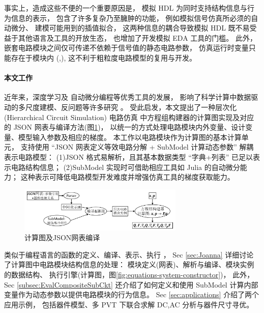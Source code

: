 事实上，造成这些不便的一个重要原因是，
模拟 HDL 为同时支持结构信息与行为信息的表示，
包含了许多复杂乃至臃肿的功能，
例如模拟信号仿真所必须的自动微分、
建模可能用到的插值拟合\cite[Sec4.5.6,Sec9.21]{verilog2014verilog}，
这两种信息的耦合导致模拟 HDL 既不易受益于其他语言及工具的开放生态，
也增加了开发模拟 EDA 工具的门槛。
此外，嵌套电路模块之间仅可传递不依赖于信号值的静态电路参数，
仿真运行时变量只能存在于模块内
(\cite[Sec3.4,Sec6]{verilog2014verilog},\cite[Sec4.10]{ieee2006ieee-1364-2005}),
这不利于粗粒度电路模型的复用与开发。

\paragraph{本文工作} 近年来，深度学习\cite{goodfellow2016deep}及
自动微分编程\cite{baydin2018automatic}等优秀工具的发展，
影响了科学计算中数据驱动的多尺度建模、反问题等许多研究
\cite{zhang2018deep,long2018pde,long2019pde}。
受此启发，本文提出了一种层次化(Hierarchical Circuit Simulation)
电路仿真\cite{fijnvandraat2002time,
ter1999numerical,mukherjee1999hierarchical,tcherniaev2003transistor}
中方程组构建器的计算图实现及对应的 JSON 网表与编译方法(图\ref{fig:flowchart})，
以统一的方式处理电路模块内外变量、设计变量、模型输入参数及相应的梯度。
本工作以电路模块作为计算图的基本计算单元，
支持使用 “JSON 网表定义等效电路分解 + SubModel 计算动态参数” 解耦表示电路模型：
(1)JSON 格式易解析，且其基本数据类型 “字典+列表” 已足以表示电路结构信息；
(2)SubModel 实现时可借助相应工具如 Julia\cite{Bezanson_Julia_A_fresh_2017}
的自动微分能力； 这种表示可降低电路模型开发难度并增强仿真工具的梯度获取能力。
\begin{figure}[htpb]
  \centering
  \includegraphics[width=0.7\textwidth]{fig/flowchart.pdf}
  \caption{计算图及JSON网表编译}
  \label{fig:flowchart}
\end{figure}

类似于编程语言的函数的定义、编译、表示、执行
\cite{aho2007compilers,muchnick1997advanced,appel2004modern}，
Sec \ref{sec:Joanna} 详细讨论了计算图中电路模块结构信息的处理：
模块定义(网表)、解析与编译、模块实例的数据结构、
执行引擎(计算图，图\ref{fig:equations-system-constructor})，
此外，Sec \ref{subsec:EvalCompositeSubCkt} 还介绍了如何定义和使用 SubModel
计算内部变量作为动态参数以提供电路模块的行为信息。
Sec \ref{sec:applications} 介绍了两个应用示例，
包括器件模型、多 PVT 下联合求解 DC,AC 分析与器件尺寸寻优。
